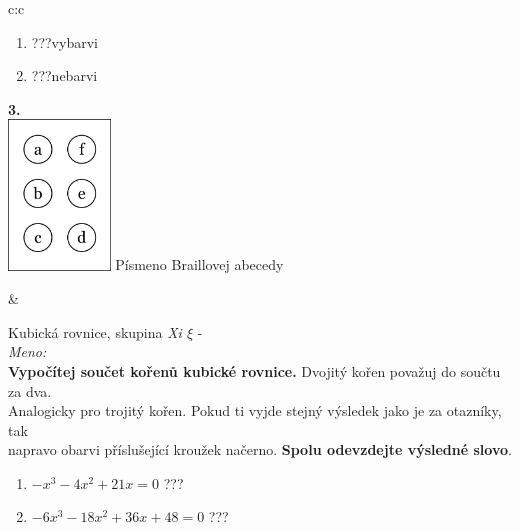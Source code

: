 \documentclass[10pt]{report}
\begin{document}
\begin{tabular}{c:c}
\begin{minipage}[c][99mm][t]{0.49\linewidth}
\begin{center}
\begin{minipage}{0.77\linewidth}
\begin{center}
\begin{varwidth}{\textwidth}
\begin{enumerate}
\item \quad \dotfill\; ???\;\dotfill \quad vybarvi
\item \quad \dotfill\; ???\;\dotfill \quad nebarvi
\end{enumerate}
\end{varwidth}
\end{center}
\end{minipage}
\begin{minipage}{0.20\linewidth}
\begin{center}
{\Huge\bfseries 3.} \\[2mm]
\includegraphics[height=40mm]{../images/braille.png}
{\small Písmeno Braillovej abecedy}
\end{center}
\end{minipage}
\end{center}
\end{minipage}
&
\begin{minipage}[c][99mm][t]{0.49\linewidth}
\begin{center}
\vspace{7mm}
{\huge Kubická rovnice, skupina \textit{Xi $\xi$} -}\\[4.5mm]
\textit{Meno:}\phantom{xxxxxxxxxxxxxxxxxxxxxxxxxxxxxxxxxxxxxxxxxxxxxxxxxxxxxxxxxxxxxxxxx}\\[3.5mm]
\textbf{Vypočítej součet kořenů kubické rovnice.} Dvojitý kořen považuj do součtu za dva.\\Analogicky pro trojitý kořen. Pokud ti vyjde stejný výsledek jako je za otazníky, tak\\napravo obarvi příslušející kroužek načerno. \textbf{Spolu odevzdejte výsledné slovo}.\\[3mm]
\begin{minipage}{0.77\linewidth}
\begin{center}
\begin{varwidth}{\textwidth}
\begin{enumerate}
\large
\item $-x^3-4x^2+21x=0$\quad \dotfill\; ???\;\dotfill {}
\item $-6x^3-18x^2+36x+48=0$\quad \dotfill\; ???\;\dotfill {}

\end{enumerate}
\end{varwidth}
\end{center}
\end{minipage}
\end{center}
\end{minipage}
\end{tabular}
\end{document}
